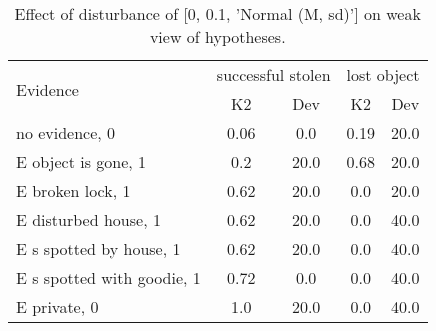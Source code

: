 \begin{table}\begin{tabular}{l|cc|cc}\toprule\multirow{2}{*}{Evidence} & \multicolumn{2}{c}{successful stolen}& \multicolumn{2}{c}{lost object}\\& {K2} & {Dev}& {K2} & {Dev}\\\midrule
no evidence, 0 & \cellcolor{Bittersweet}0.06&\cellcolor{Bittersweet}0.0&\cellcolor{Bittersweet}0.19&\cellcolor{Bittersweet}20.0\\E object is gone, 1 & \cellcolor{Bittersweet}0.2&\cellcolor{Bittersweet}20.0&\cellcolor{Bittersweet}0.68&\cellcolor{Bittersweet}20.0\\E broken lock, 1 & \cellcolor{Bittersweet}0.62&\cellcolor{Bittersweet}20.0&\cellcolor{Bittersweet}0.0&\cellcolor{Bittersweet}20.0\\E disturbed house, 1 & \cellcolor{Bittersweet}0.62&\cellcolor{Bittersweet}20.0&\cellcolor{Bittersweet}0.0&\cellcolor{Bittersweet}40.0\\E s spotted by house, 1 & \cellcolor{Bittersweet}0.62&\cellcolor{Bittersweet}20.0&\cellcolor{Bittersweet}0.0&\cellcolor{Bittersweet}40.0\\E s spotted with goodie, 1 & \cellcolor{Bittersweet}0.72&\cellcolor{Bittersweet}0.0&\cellcolor{Bittersweet}0.0&\cellcolor{Bittersweet}40.0\\E private, 0 & \cellcolor{Bittersweet}1.0&\cellcolor{Bittersweet}20.0&\cellcolor{Bittersweet}0.0&\cellcolor{Bittersweet}40.0\\\bottomrule\end{tabular}\caption{Effect of disturbance of [0, 0.1, 'Normal (M, sd)'] on weak view of hypotheses.}\end{table}